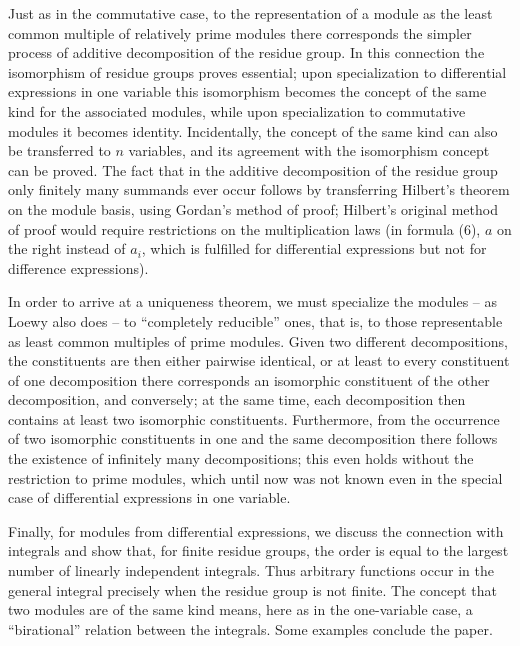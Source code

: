 \documentclass[11pt]{article}
\begin{document}
Just as in the commutative case, to the representation of a module as the least common multiple of relatively prime modules there corresponds the simpler process of additive decomposition of the residue group. In this connection the isomorphism of residue groups proves essential; upon specialization to differential expressions in one variable this isomorphism becomes the concept of the same kind for the associated modules, while upon specialization to commutative modules it becomes identity. Incidentally, the concept of the same kind can also be transferred to $n$ variables, and its agreement with the isomorphism concept can be proved. The fact that in the additive decomposition of the residue group only finitely many summands ever occur follows by transferring Hilbert's theorem on the module basis, using Gordan's method of proof; Hilbert's original method of proof would require restrictions on the multiplication laws (in formula (6), $a$ on the right instead of $a_i$, which is fulfilled for differential expressions but not for difference expressions).

In order to arrive at a uniqueness theorem, we must specialize the modules -- as Loewy also does -- to ``completely reducible'' ones, that is, to those representable as least common multiples of prime modules. Given two different decompositions, the constituents are then either pairwise identical, or at least to every constituent of one decomposition there corresponds an isomorphic constituent of the other decomposition, and conversely; at the same time, each decomposition then contains at least two isomorphic constituents. Furthermore, from the occurrence of two isomorphic constituents in one and the same decomposition there follows the existence of infinitely many decompositions; this even holds without the restriction to prime modules, which until now was not known even in the special case of differential expressions in one variable.

Finally, for modules from differential expressions, we discuss the connection with integrals and show that, for finite residue groups, the order is equal to the largest number of linearly independent integrals. Thus arbitrary functions occur in the general integral precisely when the residue group is not finite. The concept that two modules are of the same kind means, here as in the one-variable case, a ``birational'' relation between the integrals. Some examples conclude the paper.
\end{document}
